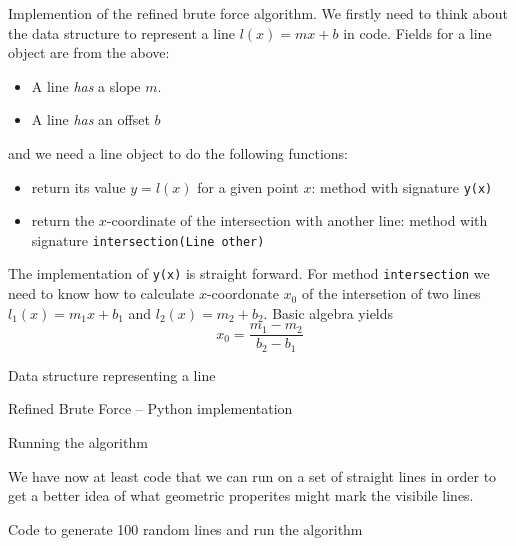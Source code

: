 \documentclass[ignorenonframetext,]{beamer}
\begin{document}
\begin{frame}{Implemention of the refined brute force algorithm.}
    We firstly need to think about the data structure to represent a
    line $l(x) = mx+b$ in code. Fields for a line object are from the
    above: 
    \begin{itemize}
    \item A line \emph{has} a slope $m$.
    \item A line \emph{has} an offset $b$
    \end{itemize}
    and we need a line object to do the following functions:
    \begin{itemize}
    \item return its value $y = l(x)$ for a given point $x$: method with signature \texttt{y(x)}
    \item return the $x$-coordinate of the intersection with another line: method with signature \texttt{intersection(Line other)}
    \end{itemize}
    The implementation of \texttt{y(x)} is straight forward. For
    method \texttt{intersection} we need to know how to calculate
    $x$-coordonate $x_0$ of the 
    intersetion of two lines $l_1(x) = m_1x + b_1$ and $l_2(x) = m_2 +
    b_2$. Basic algebra yields
    \begin{equation}
      x_0 = \frac{m_1 - m_2}{b_2 - b_1}
    \end{equation}
\end{frame}

\begin{frame}{Data structure representing a line}

\tiny

\end{frame}

\begin{frame}{Refined Brute Force -- Python implementation}
\tiny

\end{frame}

\begin{frame}{Running the algorithm}

We have now at least code that we can run on a set of straight lines
in order to get a better idea of what geometric properites might mark
the visibile lines.

\begin{block}{Code to generate 100 random lines and run the algorithm}
\tiny

\end{block}
\end{frame}
\end{document}
